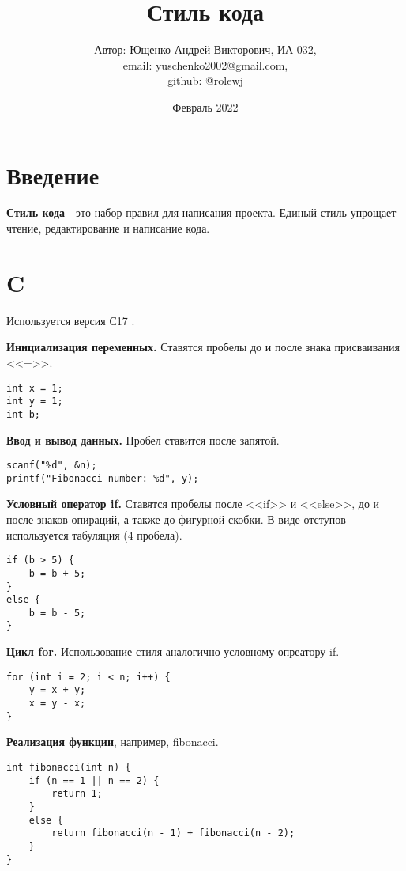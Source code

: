 \documentclass{article}
\begin{document}
\title{Стиль кода}
\author{Автор: Ющенко Андрей Викторович, ИА-032,\\ email: yuschenko2002@gmail.com,\\ github: @rolewj}
\date{Февраль 2022}

\maketitle

\section{Введение}
\textbf{Стиль кода} - это набор правил для написания проекта. Единый стиль упрощает чтение, редактирование и написание кода.

\section{C}
Используется версия С17 \cite{C}.\vspace{5mm}

\textbf{Инициализация переменных.} Ставятся пробелы до и после знака присваивания <<=>>.
\begin{lstlisting}[caption=Инициализация переменных.]
int x = 1;
int y = 1;
int b;
\end{lstlisting}

\textbf{Ввод и вывод данных.} Пробел ставится после запятой.
\begin{lstlisting}[caption=Ввод и вывод данных.]
scanf("%d", &n);
printf("Fibonacci number: %d", y);
\end{lstlisting}

\textbf{Условный оператор if.} Ставятся пробелы после <<if>> и <<else>>, до и после знаков опираций, а также до фигурной скобки. В виде отступов используется табуляция (4 пробела).
\begin{lstlisting}[caption=Условный оператор if.]
if (b > 5) {
    b = b + 5;
}
else {
    b = b - 5;
}
\end{lstlisting}

\textbf{Цикл for.} Использование стиля аналогично условному опреатору if.
\begin{lstlisting}[caption=Цикл for.]
for (int i = 2; i < n; i++) {
    y = x + y;
    x = y - x;
}
\end{lstlisting}

\textbf{Реализация функции}, например, fibonacci.
\begin{lstlisting}[caption=Реализация функции.]
int fibonacci(int n) {
    if (n == 1 || n == 2) {
        return 1;
    } 
    else {
        return fibonacci(n - 1) + fibonacci(n - 2);
    }
}
\end{lstlisting}
\end{document}
